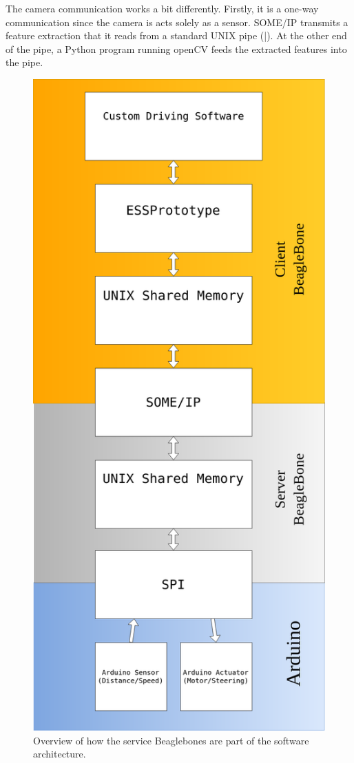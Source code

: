 \documentclass[11pt, titlepage]{article} %
\begin{document}
The camera communication works a bit differently. Firstly, it is a one-way communication since the camera
is acts solely as a sensor. SOME/IP transmits a feature extraction that it reads from a standard UNIX
pipe (|). At the other end of the pipe, a Python program running openCV feeds the extracted features
into the pipe.

\begin{figure}[H]
	\centering
   	\includegraphics[scale=0.25]{arch_bbb.png}
   	\caption{Overview of how the service Beaglebones are part of the software architecture.}
    \label{fig:bbb_arch}
\end{figure}
\end{document}
